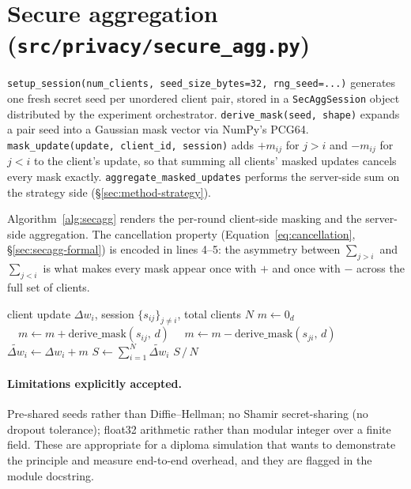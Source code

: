 \documentclass[11pt,a4paper]{report}
\begin{document}
\section{Secure aggregation (\texttt{src/privacy/secure\_agg.py})}

\texttt{setup\_session(num\_clients, seed\_size\_bytes=32, rng\_seed=...)}
generates one fresh secret seed per unordered client pair, stored in a
\texttt{SecAggSession} object distributed by the experiment orchestrator.
\texttt{derive\_mask(seed, shape)} expands a pair seed into a Gaussian
mask vector via NumPy's PCG64. \texttt{mask\_update(update, client\_id,
session)} adds $+m_{ij}$ for $j > i$ and $-m_{ij}$ for $j < i$ to the
client's update, so that summing all clients' masked updates cancels every
mask exactly. \texttt{aggregate\_masked\_updates} performs the server-side
sum on the strategy side
(\S\ref{sec:method-strategy}).

Algorithm~\ref{alg:secagg} renders the per-round client-side masking and
the server-side aggregation. The cancellation property
(Equation~\ref{eq:cancellation}, \S\ref{sec:secagg-formal}) is encoded in
lines 4--5: the asymmetry between $\sum_{j > i}$ and $\sum_{j < i}$ is
what makes every mask appear once with $+$ and once with $-$ across the
full set of clients.

\begin{algorithm}[h]
\caption{Pairwise-mask SecAgg: client $i$ masks, server aggregates}\label{alg:secagg}
\begin{algorithmic}[1]
\Require client update $\Delta w_i$, session $\{s_{ij}\}_{j \neq i}$, total clients $N$
  \State $m \gets 0_d$
     $\quad m \gets m + \mathrm{derive\_mask}(s_{ij},\, d)$
    \Else $\quad m \gets m - \mathrm{derive\_mask}(s_{ji},\, d)$
    \EndIf
  \EndFor
  \State \Return $\tilde{\Delta w}_i \gets \Delta w_i + m$
\EndFunction
\Statex
{}
  \State $S \gets \sum_{i=1}^{N} \tilde{\Delta w}_i$ 
  \State \Return $S \,/\, N$ 
\EndFunction
\end{algorithmic}
\end{algorithm}

\paragraph{Limitations explicitly accepted.}
Pre-shared seeds rather than Diffie--Hellman; no Shamir secret-sharing
(no dropout tolerance); float32 arithmetic rather than modular integer over
a finite field. These are appropriate for a diploma simulation that wants
to demonstrate the principle and measure end-to-end overhead, and they are
flagged in the module docstring.
\end{document}
